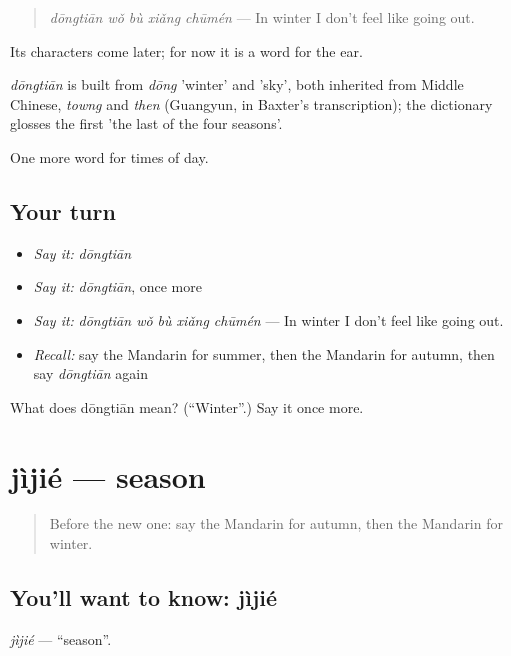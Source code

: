 \begin{quote}
\emph{dōngtiān wǒ bù xiǎng chūmén} — In winter I don't feel like going out.
\end{quote}

Its characters come later; for now it is a word for the ear.

\begin{cousinweb}
\emph{dōngtiān} is built from \emph{dōng} 'winter' and  'sky', both inherited from Middle Chinese, \emph{towng} and \emph{then} (Guangyun, in Baxter's transcription); the dictionary glosses the first 'the last of the four seasons'.
\end{cousinweb}

\begin{grammarlens}[title={What you've built}]
One more word for times of day.
\end{grammarlens}

\subsection*{Your turn}
\begin{itemize}
\raggedright
  \item \emph{Say it:} \emph{dōngtiān}
  \item \emph{Say it:} \emph{dōngtiān}, once more
  \item \emph{Say it:} \emph{dōngtiān wǒ bù xiǎng chūmén} — In winter I don't feel like going out.
  \item \emph{Recall:} say the Mandarin for summer, then the Mandarin for autumn, then say \emph{dōngtiān} again
\end{itemize}

\begin{tcolorbox}[breakable,colback=teal!4,colframe=teal!35!black,title={Before you move on}]
What does dōngtiān mean? (\textquotedblleft{}Winter\textquotedblright{}.) Say it once more.
\end{tcolorbox}
\section[jìjié]{jìjié — season}

\label{lesson:ZH-C131-jijie}



\begin{quote}
Before the new one: say the Mandarin for autumn, then the Mandarin for winter.
\end{quote}

\subsection*{You'll want to know: jìjié}
\emph{jìjié} — \textquotedblleft{}season\textquotedblright{}.

